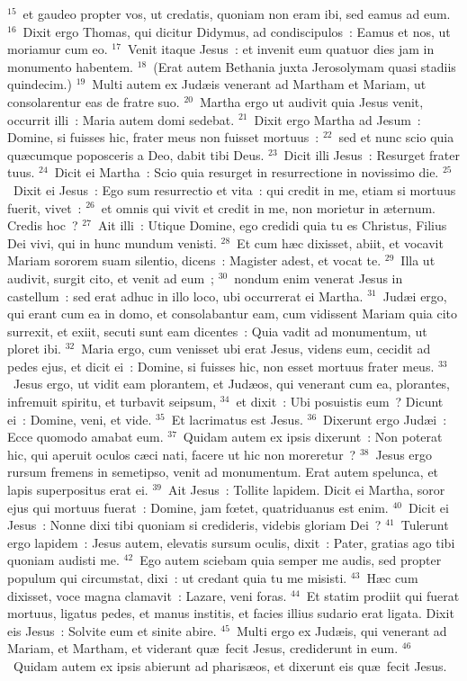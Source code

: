 ${}^{15}$~et gaudeo propter vos, ut credatis, quoniam non eram ibi, sed eamus ad eum.
${}^{16}$~Dixit ergo Thomas, qui dicitur Didymus, ad condiscipulos~: Eamus et nos, ut moriamur cum eo.
${}^{17}$~Venit itaque Jesus~: et invenit eum quatuor dies jam in monumento habentem.
${}^{18}$~(Erat autem Bethania juxta Jerosolymam quasi stadiis quindecim.)
${}^{19}$~Multi autem ex Jud\ae is venerant ad Martham et Mariam, ut consolarentur eas de fratre suo.
${}^{20}$~Martha ergo ut audivit quia Jesus venit, occurrit illi~: Maria autem domi sedebat.
${}^{21}$~Dixit ergo Martha ad Jesum~: Domine, si fuisses hic, frater meus non fuisset mortuus~:
${}^{22}$~sed et nunc scio quia qu\ae cumque poposceris a Deo, dabit tibi Deus.
${}^{23}$~Dicit illi Jesus~: Resurget frater tuus.
${}^{24}$~Dicit ei Martha~: Scio quia resurget in resurrectione in novissimo die.
${}^{25}$~Dixit ei Jesus~: Ego sum resurrectio et vita~: qui credit in me, etiam si mortuus fuerit, vivet~:
${}^{26}$~et omnis qui vivit et credit in me, non morietur in \ae ternum. Credis hoc~?
${}^{27}$~Ait illi~: Utique Domine, ego credidi quia tu es Christus, Filius Dei vivi, qui in hunc mundum venisti.
${}^{28}$~Et cum h\ae c dixisset, abiit, et vocavit Mariam sororem suam silentio, dicens~: Magister adest, et vocat te.
${}^{29}$~Illa ut audivit, surgit cito, et venit ad eum~;
${}^{30}$~nondum enim venerat Jesus in castellum~: sed erat adhuc in illo loco, ubi occurrerat ei Martha.
${}^{31}$~Jud\ae i ergo, qui erant cum ea in domo, et consolabantur eam, cum vidissent Mariam quia cito surrexit, et exiit, secuti sunt eam dicentes~: Quia vadit ad monumentum, ut ploret ibi.
${}^{32}$~Maria ergo, cum venisset ubi erat Jesus, videns eum, cecidit ad pedes ejus, et dicit ei~: Domine, si fuisses hic, non esset mortuus frater meus.
${}^{33}$~Jesus ergo, ut vidit eam plorantem, et Jud\ae os, qui venerant cum ea, plorantes, infremuit spiritu, et turbavit seipsum,
${}^{34}$~et dixit~: Ubi posuistis eum~? Dicunt ei~: Domine, veni, et vide.
${}^{35}$~Et lacrimatus est Jesus.
${}^{36}$~Dixerunt ergo Jud\ae i~: Ecce quomodo amabat eum.
${}^{37}$~Quidam autem ex ipsis dixerunt~: Non poterat hic, qui aperuit oculos c\ae ci nati, facere ut hic non moreretur~?
${}^{38}$~Jesus ergo rursum fremens in semetipso, venit ad monumentum. Erat autem spelunca, et lapis superpositus erat ei.
${}^{39}$~Ait Jesus~: Tollite lapidem. Dicit ei Martha, soror ejus qui mortuus fuerat~: Domine, jam fœtet, quatriduanus est enim.
${}^{40}$~Dicit ei Jesus~: Nonne dixi tibi quoniam si credideris, videbis gloriam Dei~?
${}^{41}$~Tulerunt ergo lapidem~: Jesus autem, elevatis sursum oculis, dixit~: Pater, gratias ago tibi quoniam audisti me.
${}^{42}$~Ego autem sciebam quia semper me audis, sed propter populum qui circumstat, dixi~: ut credant quia tu me misisti.
${}^{43}$~H\ae c cum dixisset, voce magna clamavit~: Lazare, veni foras.
${}^{44}$~Et statim prodiit qui fuerat mortuus, ligatus pedes, et manus institis, et facies illius sudario erat ligata. Dixit eis Jesus~: Solvite eum et sinite abire.
${}^{45}$~Multi ergo ex Jud\ae is, qui venerant ad Mariam, et Martham, et viderant qu\ae\ fecit Jesus, crediderunt in eum.
${}^{46}$~Quidam autem ex ipsis abierunt ad pharis\ae os, et dixerunt eis qu\ae\ fecit Jesus.


